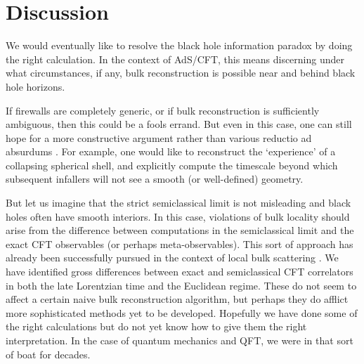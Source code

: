\section{Discussion}

We would eventually like to resolve the black hole information paradox by doing the right calculation.  In the context of AdS/CFT, this means discerning under what circumstances, if any, bulk reconstruction is possible near and behind black hole horizons.  

If firewalls \cite{Almheiri:2012rt} are completely generic, or if bulk reconstruction is sufficiently ambiguous, then this could be a fools errand.    But even in this case, one can still hope for a more constructive argument rather than various reductio ad absurdums \cite{Almheiri:2013hfa}.  For example, one would like to reconstruct the `experience' of a collapsing spherical shell, and explicitly compute the timescale beyond which subsequent infallers will not see a smooth (or well-defined) geometry.

But let us imagine that the strict semiclassical limit is not misleading and black holes often have smooth interiors.  In this case, violations of bulk locality should arise from the difference between computations in the semiclassical limit and the exact CFT observables (or perhaps meta-observables).  This sort of approach has already been successfully pursued in the context of local bulk scattering \cite{Maldacena:2015iua}.  We have identified gross differences between exact and semiclassical CFT correlators in both the late Lorentzian time and the Euclidean regime.    These do not seem to affect a certain naive bulk reconstruction algorithm, but perhaps they do afflict more sophisticated methods yet to be developed.   Hopefully we have done some of the right calculations but do not yet know how to give them the right interpretation.  In the case of quantum mechanics and QFT, we were in that sort of boat for decades.

